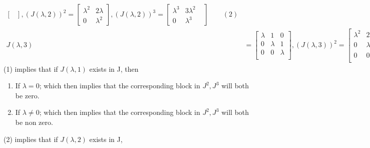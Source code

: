 \documentclass{uofa-eng-assignment}
\begin{document}
\begin{enumerate}
\begin{align*}
\begin{bmatrix}
	      	\end{bmatrix}, 
	      	(J(\lambda, 2))^2 = \begin{bmatrix}
	      	\lambda^2 &2\lambda \\
	      	0 &\lambda^2
	      	\end{bmatrix}      ,
	      	(J(\lambda, 2))^3 = \begin{bmatrix}
	      	\lambda^3 & 3\lambda^2 &            \\ 0 &\lambda^3
	      	\end{bmatrix}    \qquad (2)  \\
	      	J(\lambda, 3) &= \begin{bmatrix}
	      	\lambda   & 1          & 0          \\
	      	0         & \lambda    & 1          \\
	      	0         & 0          & \lambda    \\
	      	\end{bmatrix},                
	      	(J(\lambda, 3))^2 = \begin{bmatrix}
	      	\lambda^2 & 2\lambda   & 1          \\
	      	0         & \lambda^2  & 2\lambda   \\
	      	0         & 0          & \lambda^2  \\
	      	\end{bmatrix},
	      	(J(\lambda, 3))^3 = \begin{bmatrix}
	      	\lambda^3 & 3\lambda^2 & 3\lambda   \\
	      	0         & \lambda^3  & 3\lambda^2 \\
	      	0         & 0          & \lambda^3  \\
	      	\end{bmatrix} = 0 \qquad (3)
	      \end{align*}
	      (1) implies that if $J(\lambda, 1)$ exists in J, then 
       \begin{enumerate}[i]
           \item If $\lambda = 0$; which then implies that the corresponding block in $J^2, J^3$ will both be zero. \\
           \item If $\lambda \neq 0$; which then implies that the corresponding block in $J^2, J^3$ will both be non zero. \\
       \end{enumerate}
	      (2) implies that if $J(\lambda, 2)$ exists in J, 
       \begin{enumerate}[i]

\end{enumerate}
\end{enumerate}
\end{document}
